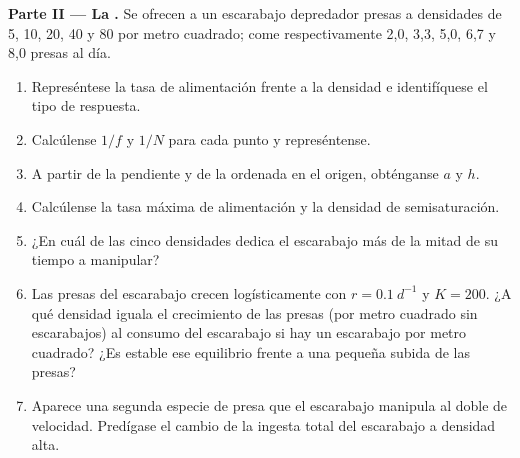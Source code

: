 \begin{problem}
\medskip
\noindent\textbf{Parte II --- La .}
Se ofrecen a un escarabajo depredador presas a densidades de 5, 10, 20, 40 y
80 por metro cuadrado; come respectivamente 2,0, 3,3, 5,0, 6,7 y 8,0 presas
al día.
\begin{enumerate}[resume]
  \item Represéntese la tasa de alimentación frente a la densidad e
        identifíquese el tipo de respuesta.
  \item Calcúlense $1/f$ y $1/N$ para cada punto y represéntense.
  \item A partir de la pendiente y de la ordenada en el origen, obténganse
        $a$ y $h$.
  \item Calcúlense la tasa máxima de alimentación y la densidad de
        semisaturación.
  \item ¿En cuál de las cinco densidades dedica el escarabajo más de la
        mitad de su tiempo a manipular?
  \item Las presas del escarabajo crecen logísticamente con
        $r = \qty{0.1}{d^{-1}}$ y $K = 200$. ¿A qué densidad iguala el
        crecimiento de las presas (por metro cuadrado sin escarabajos) al
        consumo del escarabajo si hay un escarabajo por metro cuadrado? ¿Es
        estable ese equilibrio frente a una pequeña subida de las presas?
  \item Aparece una segunda especie de presa que el escarabajo manipula al
        doble de velocidad. Predígase el cambio de la ingesta total del
        escarabajo a densidad alta.
\end{enumerate}


\end{problem}
